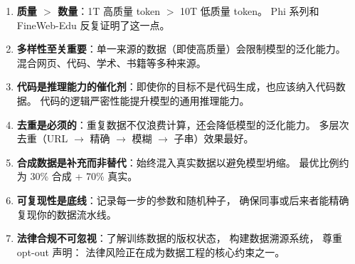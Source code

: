 \begin{corebox}[数据工程的核心原则]
\begin{enumerate}[noitemsep]
  \item \textbf{质量 $>$ 数量}：1T 高质量 token $>$ 10T 低质量 token。
        Phi 系列和 FineWeb-Edu 反复证明了这一点。
  \item \textbf{多样性至关重要}：单一来源的数据（即使高质量）会限制模型的泛化能力。
        混合网页、代码、学术、书籍等多种来源。
  \item \textbf{代码是推理能力的催化剂}：即使你的目标不是代码生成，也应该纳入代码数据。
        代码的逻辑严密性能提升模型的通用推理能力。
  \item \textbf{去重是必须的}：重复数据不仅浪费计算，还会降低模型的泛化能力。
        多层次去重（URL $\to$ 精确 $\to$ 模糊 $\to$ 子串）效果最好。
  \item \textbf{合成数据是补充而非替代}：始终混入真实数据以避免模型坍缩。
        最优比例约为 30\% 合成 + 70\% 真实。
  \item \textbf{可复现性是底线}：记录每一步的参数和随机种子，
        确保同事或后来者能精确复现你的数据流水线。
  \item \textbf{法律合规不可忽视}：了解训练数据的版权状态，
        构建数据溯源系统，
        尊重 opt-out 声明：
        法律风险正在成为数据工程的核心约束之一。
\end{enumerate}
\end{corebox}


